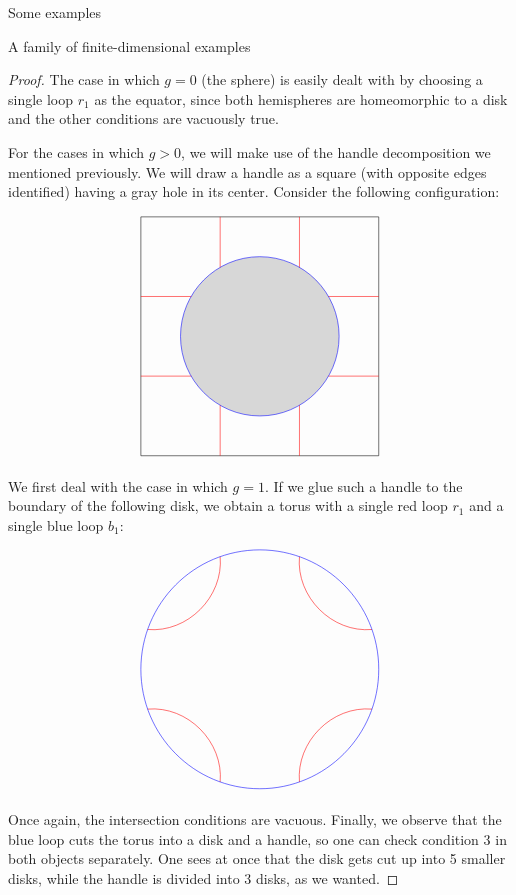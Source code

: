 \begin{chapter}{Some examples}
\begin{section}{A family of finite-dimensional examples}
\begin{proof}
The case in which $g=0$ (the sphere) is easily dealt with by choosing a single loop $r_1$ as the equator, since both hemispheres are homeomorphic to a disk and the other conditions are vacuously true.

For the cases in which $g>0$, we will make use of the handle decomposition we mentioned previously. We will draw a handle as a square (with opposite edges identified) having a gray hole in its center. Consider the following configuration:

\begin{figure}[h]
\[
\begin{tikzpicture}
\draw (0,0) node[minimum size=6cm,draw] {};

\fill [black,opacity=.15] circle (2cm);

\draw[red] (-3,1) -- (-1.73,1);
\draw[red] (-3,-1) -- (-1.73,-1);

\draw[red] (3,1) -- (1.73,1);
\draw[red] (3,-1) -- (1.73,-1);

\draw[red] (1,-3) -- (1,-1.73);
\draw[red] (-1,-3) -- (-1,-1.73);

\draw[red] (1,3) -- (1,1.73);
\draw[red] (-1,3) -- (-1,1.73);

\draw[blue] (0,0) circle (2cm);
\end{tikzpicture}
\]
\end{figure}

We first deal with the case in which $g=1$. If we glue such a handle to the boundary of the following disk, we obtain a torus with a single red loop $r_1$ and a single blue loop $b_1$:

\begin{figure}[h]
\label{divided-handle}
\[
\begin{tikzpicture}

\draw[red] (-2.83,1) to [bend right=50] (-1,2.83);
\draw[red] (2.83,1) to [bend left=50] (1,2.83);
\draw[red] (2.83,-1) to [bend right=50] (1,-2.83);
\draw[red] (-2.83,-1) to [bend left=50] (-1,-2.83);

\draw[blue] (0,0) circle (3cm);
\end{tikzpicture}
\]
\end{figure}

Once again, the intersection conditions are vacuous. Finally, we observe that the blue loop cuts the torus into a disk and a handle, so one can check condition $3$ in both objects separately. One sees at once that the disk gets cut up into 5 smaller disks, while the handle is divided into $3$ disks, as we wanted.


\end{proof}
\end{section}
\end{chapter}
